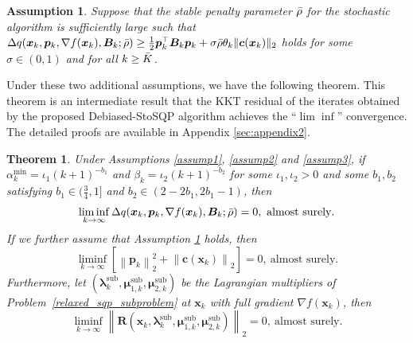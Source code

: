 \documentclass[aos]{imsart}
\numberwithin{equation}{section}
\theoremstyle{plain}
\newtheorem{assumption}{Assumption}
\newtheorem{theorem}{Theorem}
\begin{document}
\begin{assumption}
\label{assump8}
    Suppose that the stable penalty parameter $\Bar{\rho}$ for the stochastic algorithm is sufficiently large such that 
    $\Delta q(\bm{x}_k,\bm{p}_k,\nabla f(\bm{x}_k),\bm{B}_k;\Bar{\rho}) \geq \frac{1}{2} \bm{p}_k^{\top} \bm{B}_k \bm{p}_k + \sigma \Bar{\rho} \theta_k \|\bm{c}(\bm{x}_k)\|_2$ holds for some $\sigma \in (0,1)$ and for all $k \geq \Bar{K}$. 
    
\end{assumption}

Under these two additional assumptions, we have the following theorem.
This theorem is an intermediate result that the KKT residual of the iterates obtained by the proposed Debiased-StoSQP algorithm achieves the ``$\lim \inf$'' convergence. The detailed proofs are available in Appendix \ref{sec:appendix2}.

\begin{theorem}
\label{theorem_lim_inf}
    Under Assumptions \ref{assump1}, \ref{assump2} and \ref{assump3}, if $\alpha_k^{\text{min}} = \iota_1 (k+1)^{-b_1}$ and $\beta_k = \iota_2 (k+1)^{-b_2}$ for some $\iota_1, \iota_2 >0$ and some $b_1, b_2$ satisfying $b_1 \in (\frac{3}{4},1]$ and $b_2 \in \left( 2-2b_1,2b_1-1\right)$, then  
    \begin{equation*}
        \mathop{\lim \inf}_{k \to \infty} \Delta q(\bm{x}_k,\bm{p}_k,\nabla f(\bm{x}_k),\bm{B}_k;\Bar{\rho}) = 0,~\text{almost surely}.
    \end{equation*}
    If we further assume that Assumption \ref{assump8} holds, then
    \begin{equation*}
        \mathop{\lim \inf}_{k \to \infty} \left[\left\|\bm{p}_k\right\|_2^2 + \left\|\bm{c}(\bm{x}_k) \right\|_2 \right] = 0,~\text{almost surely}.
    \end{equation*}
    Furthermore, let $(\bm{\lambda}_k^{\text{sub}}, \bm{\mu}_{1,k}^{\text{sub}},\bm{\mu}_{2,k}^{\text{sub}})$ be the Lagrangian multipliers of Problem~\eqref{relaxed_sqp_subproblem} at $\bm{x}_k$ with full gradient $\nabla f(\bm{x}_k)$, then 
    \begin{equation}
        \mathop{\lim \inf}_{k \to \infty} \left\| \bm{R}(\bm{x}_k, \bm{\lambda}_k^{\text{sub}}, \bm{\mu}_{1,k}^{\text{sub}}, \bm{\mu}_{2,k}^{\text{sub}}) \right\|_2 = 0,~\text{almost surely}.
    \end{equation}
\end{theorem}
\end{document}
